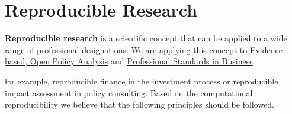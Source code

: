\documentclass[
  a4paper,
  openany, a4paper, oneside]{book}
\begin{document}
\hypertarget{reproducible-research}{%
\section{Reproducible Research}\label{reproducible-research}}

\textbf{Reproducible research} is a scientific concept that can be applied to a wide range of professional designations. We are applying this concept to \protect\hyperlink{opa}{Evidence-based, Open Policy Analysis} and \protect\hyperlink{business-professional-standards}{Professional Standards in Business}.

for example, reproducible finance in the investment process or reproducible impact assessment in policy consulting. Based on the computational reproducibility we believe that the following principles should be followed.
\end{document}
